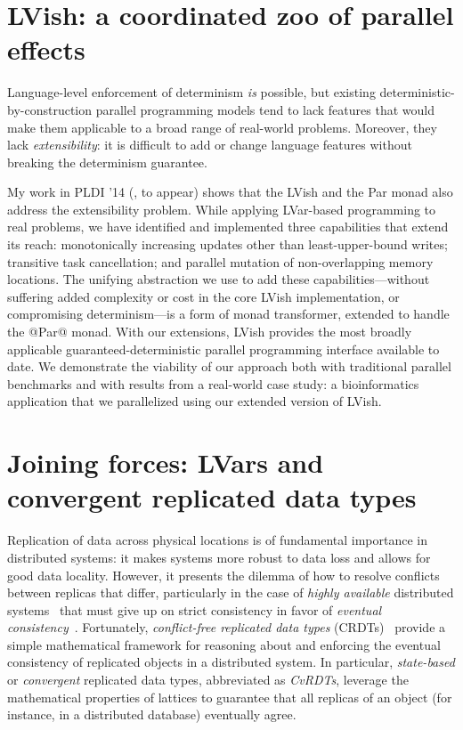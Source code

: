 \documentclass{article}
\begin{document}
\section{LVish: a coordinated zoo of parallel effects}\label{effectzoo}

Language-level enforcement of determinism \emph{is} possible, but
existing deterministic-by-construction parallel programming models
tend to lack features that would make them applicable to a broad range
of real-world problems. Moreover, they lack \emph{extensibility}: it
is difficult to add or change language features without breaking the
determinism guarantee.

My work in PLDI '14 (\cite{effectzoo}, to appear) shows that the LVish
and the Par monad also address the extensibility problem. While
applying LVar-based programming to real problems, we have identified
and implemented three capabilities that extend its reach:
monotonically increasing updates other than least-upper-bound writes;
transitive task cancellation; and parallel mutation of non-overlapping
memory locations. The unifying abstraction we use to add these
capabilities---without suffering added complexity or cost in the core
LVish implementation, or compromising determinism---is a form of monad
transformer, extended to handle the @Par@ monad. With our extensions,
LVish provides the most broadly applicable guaranteed-deterministic
parallel programming interface available to date. We demonstrate the
viability of our approach both with traditional parallel benchmarks
and with results from a real-world case study: a bioinformatics
application that we parallelized using our extended version of LVish.

\section{Joining forces: LVars and convergent replicated data types}\label{crdts}

Replication of data across physical locations is of fundamental
importance in distributed systems: it makes systems more robust to
data loss and allows for good data locality.  However, it presents the
dilemma of how to resolve conflicts between replicas that differ,
particularly in the case of \emph{highly available} distributed
systems~\cite{dynamo} that must give up on strict consistency in favor
of \emph{eventual consistency}~\cite{vogels-ec}.  Fortunately,
\emph{conflict-free replicated data types} (CRDTs)~\cite{crdts}
provide a simple mathematical framework for reasoning about and
enforcing the eventual consistency of replicated objects in a
distributed system.  In particular, \emph{state-based} or
\emph{convergent} replicated data types, abbreviated as \emph{CvRDTs},
leverage the mathematical properties of lattices to guarantee that all
replicas of an object (for instance, in a distributed database)
eventually agree.
\end{document}
